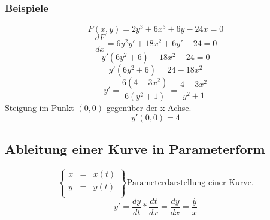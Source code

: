 \documentclass[11pt]{amsart}
\theoremstyle{remark}
\begin{document}
\subsubsection*{Beispiele}
\begin{equation}
F(x,y)=2y^3+6x^3+6y-24x=0
\end{equation}
\begin{equation*}
\frac {dF}{dx} = 6y^2y' + 18x^2 + 6y' -24=0
\end{equation*}
\begin{equation*}
y'(6y^2+6)+18x^2-24=0
\end{equation*}
\begin{equation*}
y'(6y^2+6)=24-18x^2
\end{equation*}
\begin{equation*}
y'= \frac {6(4-3x^2)}{6(y^2+1)}=\frac {4-3x^2}{y^2+1}
\end{equation*}
Steigung im Punkt $(0,0)$ gegen\"uber der x-Achse.
\begin{equation*}
y'(0,0)=4
\end{equation*}

\subsection{Ableitung einer Kurve in Parameterform}
\begin{equation*}
\left\lbrace \begin{array}{ccc}
  x & = & x(t)\\
  y & = & y(t)\\
\end{array}\right\rbrace
\text{Parameterdarstellung einer Kurve.}
\end{equation*}
\begin{equation*}
y'=\frac {dy}{dt} * \frac {dt}{dx} = \frac {dy}{dx} = \frac {\overset {.}{y}}{\overset {.}{x}}
\end{equation*}
\end{document}
